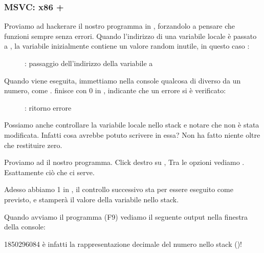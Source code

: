 \clearpage
\subsubsection{MSVC: x86 + \olly}

Proviamo ad hackerare il nostro programma in \olly, forzandolo a pensare che \scanf funzioni sempre senza errori.
Quando l'indirizzo di una variabile locale è passato a \scanf, la variabile inizialmente contiene un valore random inutile, in questo caso :

\begin{figure}[H]
\centering
{}
\caption{\olly: passaggio dell'indirizzo della variabile a \scanf}
\label{fig:scanf_ex3_olly_1}
\end{figure}

\clearpage
Quando \scanf viene eseguita, immettiamo nella console qualcosa di diverso da un numero, come .
\scanf finisce con 0 in \EAX, indicante che un errore si è verificato:

\begin{figure}[H]
\centering
{}
\caption{\olly: \scanf ritorno errore}
\label{fig:scanf_ex3_olly_2}
\end{figure}

Possiamo anche controllare la variabile locale nello stack e notare che non è stata modificata.
Infatti cosa avrebbe potuto scrivere \scanf in essa? Non ha fatto niente oltre che restituire zero. 


Proviamo ad  il nostro programma.
Click destro su \EAX, 
Tra le opzioni vediamo .
Esattamente ciò che ci serve.

Adesso abbiamo 1 in \EAX, il controllo successivo sta per essere eseguito come previsto,
e \printf stamperà il valore della variabile nello stack.

Quando avviamo il programma (F9) vediamo il seguente output nella finestra della console:



1850296084 è infatti la rappresentazione decimale del numero nello stack ()!
